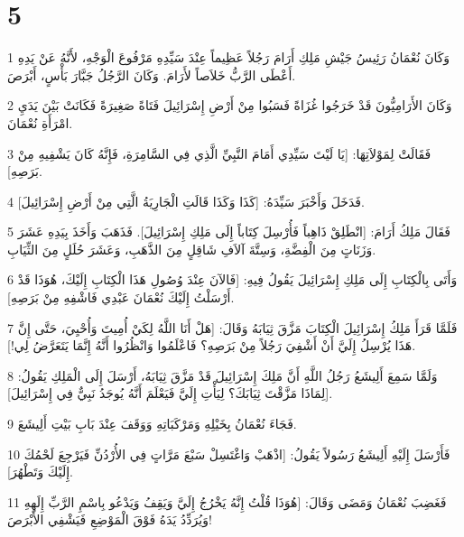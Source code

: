 \chapter{5}

\par 1 وَكَانَ نُعْمَانُ رَئِيسُ جَيْشِ مَلِكِ أَرَامَ رَجُلاً عَظِيماً عِنْدَ سَيِّدِهِ مَرْفُوعَ الْوَجْهِ، لأَنَّهُ عَنْ يَدِهِ أَعْطَى الرَّبُّ خَلاَصاً لأَرَامَ. وَكَانَ الرَّجُلُ جَبَّارَ بَأْسٍ، أَبْرَصَ.
\par 2 وَكَانَ الأَرَامِيُّونَ قَدْ خَرَجُوا غُزَاةً فَسَبُوا مِنْ أَرْضِ إِسْرَائِيلَ فَتَاةً صَغِيرَةً فَكَانَتْ بَيْنَ يَدَيِ امْرَأَةِ نُعْمَانَ.
\par 3 فَقَالَتْ لِمَوْلاَتِهَا: [يَا لَيْتَ سَيِّدِي أَمَامَ النَّبِيِّ الَّذِي فِي السَّامِرَةِ، فَإِنَّهُ كَانَ يَشْفِيهِ مِنْ بَرَصِهِ].
\par 4 فَدَخَلَ وَأَخْبَرَ سَيِّدَهُ: [كَذَا وَكَذَا قَالَتِ الْجَارِيَةُ الَّتِي مِنْ أَرْضِ إِسْرَائِيلَ].
\par 5 فَقَالَ مَلِكُ أَرَامَ: [انْطَلِقْ ذَاهِباً فَأُرْسِلَ كِتَاباً إِلَى مَلِكِ إِسْرَائِيلَ]. فَذَهَبَ وَأَخَذَ بِيَدِهِ عَشَرَ وَزَنَاتٍ مِنَ الْفِضَّةِ، وَسِتَّةَ آلاَفِ شَاقِلٍ مِنَ الذَّهَبِ، وَعَشَرَ حُلَلٍ مِنَ الثِّيَابِ.
\par 6 وَأَتَى بِالْكِتَابِ إِلَى مَلِكِ إِسْرَائِيلَ يَقُولُ فِيهِ: [فَالآنَ عِنْدَ وُصُولِ هَذَا الْكِتَابِ إِلَيْكَ، هُوَذَا قَدْ أَرْسَلْتُ إِلَيْكَ نُعْمَانَ عَبْدِي فَاشْفِهِ مِنْ بَرَصِهِ].
\par 7 فَلَمَّا قَرَأَ مَلِكُ إِسْرَائِيلَ الْكِتَابَ مَزَّقَ ثِيَابَهُ وَقَالَ: [هَلْ أَنَا اللَّهُ لِكَيْ أُمِيتَ وَأُحْيِيَ، حَتَّى إِنَّ هَذَا يُرْسِلُ إِلَيَّ أَنْ أَشْفِيَ رَجُلاً مِنْ بَرَصِهِ؟ فَاعْلَمُوا وَانْظُرُوا أَنَّهُ إِنَّمَا يَتَعَرَّضُ لِي!].
\par 8 وَلَمَّا سَمِعَ أَلِيشَعُ رَجُلُ اللَّهِ أَنَّ مَلِكَ إِسْرَائِيلَ قَدْ مَزَّقَ ثِيَابَهُ، أَرْسَلَ إِلَى الْمَلِكِ يَقُولُ: [لِمَاذَا مَزَّقْتَ ثِيَابَكَ؟ لِيَأْتِ إِلَيَّ فَيَعْلَمَ أَنَّهُ يُوجَدُ نَبِيٌّ فِي إِسْرَائِيلَ].
\par 9 فَجَاءَ نُعْمَانُ بِخَيْلِهِ وَمَرْكَبَاتِهِ وَوَقَفَ عِنْدَ بَابِ بَيْتِ أَلِيشَعَ.
\par 10 فَأَرْسَلَ إِلَيْهِ أَلِيشَعُ رَسُولاً يَقُولُ: [اذْهَبْ وَاغْتَسِلْ سَبْعَ مَرَّاتٍ فِي الأُرْدُنِّ فَيَرْجِعَ لَحْمُكَ إِلَيْكَ وَتَطْهُرَ].
\par 11 فَغَضِبَ نُعْمَانُ وَمَضَى وَقَالَ: [هُوَذَا قُلْتُ إِنَّهُ يَخْرُجُ إِلَيَّ وَيَقِفُ وَيَدْعُو بِاسْمِ الرَّبِّ إِلَهِهِ وَيُرَدِّدُ يَدَهُ فَوْقَ الْمَوْضِعِ فَيَشْفِي الأَبْرَصَ!
